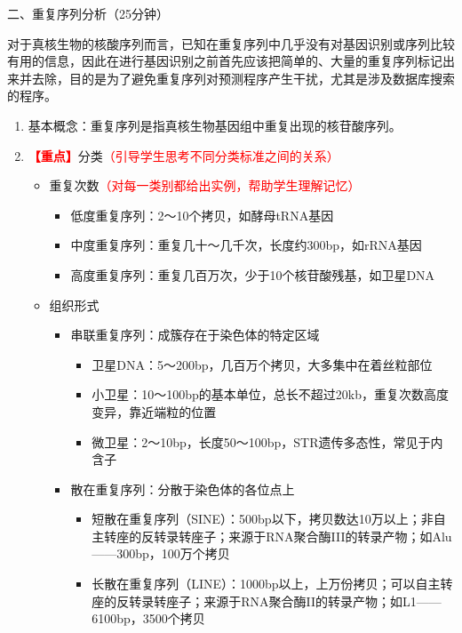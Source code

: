 \documentclass{TIJMUjiaoanLL}
\begin{document}
\vspace*{0.2cm}
\noindent
二、重复序列分析（25分钟）

对于真核生物的核酸序列而言，已知在重复序列中几乎没有对基因识别或序列比较有用的信息，因此在进行基因识别之前首先应该把简单的、大量的重复序列标记出来并去除，目的是为了避免重复序列对预测程序产生干扰，尤其是涉及数据库搜索的程序。
\begin{enumerate}
  \item 基本概念：重复序列是指真核生物基因组中重复出现的核苷酸序列。
  \item \textcolor{red}{\textbf{【重点】}}分类\textcolor{red}{（引导学生思考不同分类标准之间的关系）}
    \begin{itemize}
      \item 重复次数\textcolor{red}{（对每一类别都给出实例，帮助学生理解记忆）}
	\begin{itemize}
	  \item 低度重复序列：2～10个拷贝，如酵母tRNA基因
	  \item 中度重复序列：重复几十～几千次，长度约300bp，如rRNA基因
	  \item 高度重复序列：重复几百万次，少于10个核苷酸残基，如卫星DNA
	\end{itemize}
      \item 组织形式
	\begin{itemize}
	  \item 串联重复序列：成簇存在于染色体的特定区域
	    \begin{itemize}
	      \item 卫星DNA：5～200bp，几百万个拷贝，大多集中在着丝粒部位
	      \item 小卫星：10～100bp的基本单位，总长不超过20kb，重复次数高度变异，靠近端粒的位置
	      \item 微卫星：2～10bp，长度50～100bp，STR遗传多态性，常见于内含子
	    \end{itemize}
	  \item 散在重复序列：分散于染色体的各位点上
	    \begin{itemize}
	      \item 短散在重复序列（SINE）：500bp以下，拷贝数达10万以上；非自主转座的反转录转座子；来源于RNA聚合酶III的转录产物；如Alu——300bp，100万个拷贝
	      \item 长散在重复序列（LINE）：1000bp以上，上万份拷贝；可以自主转座的反转录转座子；来源于RNA聚合酶II的转录产物；如L1——6100bp，3500个拷贝
	    \end{itemize}
	\end{itemize}
    \end{itemize}

\end{enumerate}
\end{document}
